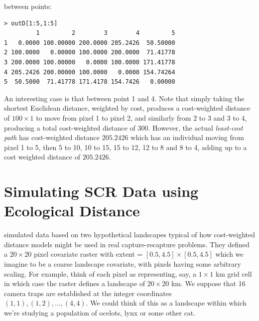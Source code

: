 between points:
\begin{center}
{\small
\begin{verbatim}
> outD[1:5,1:5]
         1         2        3        4         5
1   0.0000 100.00000 200.0000 205.2426  50.50000
2 100.0000   0.00000 100.0000 200.0000  71.41778
3 200.0000 100.00000   0.0000 100.0000 171.41778
4 205.2426 200.00000 100.0000   0.0000 154.74264
5  50.5000  71.41778 171.4178 154.7426   0.00000
\end{verbatim}
}
\end{center}
An interesting case is that between point 1 and 4. Note that simply
taking the shortest Euclidean distance, weighted by cost, produces a
cost-weighted distance of $100 \times 1$ to move from pixel 1 to pixel
2, and similarly from 2 to 3 and 3 to 4, producing a total
cost-weighted distance of $300$. However, the actual {\it least-cost
  path} has cost-weighted distance $205.2426$ which 
 has an individual moving from pixel 1 to 5, then 5
to 10, 10 to 15, 15 to 12, 12 to 8 and 8 to 4, adding up to a cost
weighted distance of 
$205.2426$.


\section{Simulating SCR Data using Ecological Distance}
\label{ecoldist.sec.simulating}

\citet{royle_etal:2012ecol} simulated data based on two hypothetical
landscapes typical of how
cost-weighted distance models might be used in real capture-recapture
problems.  They defined a $20 \times 20$ pixel covariate raster with
extent = $[0.5, 4.5] \times [0.5, 4.5]$ which we imagine to be a 
 coarse landscape covariate, with pixels
having some arbitrary scaling. For example, think of each pixel as
representing, say, a $1 \times 1$ km grid cell in which case 
the raster defines a landscape of $20 \times 20$ km. We suppose
that 16 camera traps are established at the integer coordinates
$(1,1), (1,2), \ldots, (4,4)$. We could think of this as a landscape
within which we're studying a population of ocelots, lynx or some
other cat.

